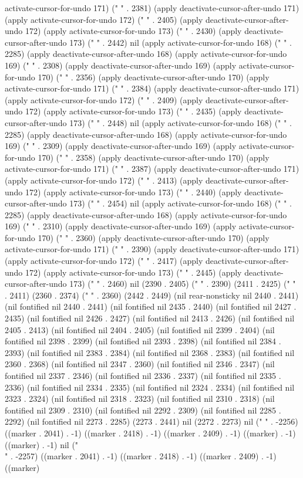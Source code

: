 activate-cursor-for-undo 171) (" " . 2381) (apply deactivate-cursor-after-undo 171) (apply activate-cursor-for-undo 172) (" " . 2405) (apply deactivate-cursor-after-undo 172) (apply activate-cursor-for-undo 173) (" " . 2430) (apply deactivate-cursor-after-undo 173) (" " . 2442) nil (apply activate-cursor-for-undo 168) (" " . 2285) (apply deactivate-cursor-after-undo 168) (apply activate-cursor-for-undo 169) (" " . 2308) (apply deactivate-cursor-after-undo 169) (apply activate-cursor-for-undo 170) (" " . 2356) (apply deactivate-cursor-after-undo 170) (apply activate-cursor-for-undo 171) (" " . 2384) (apply deactivate-cursor-after-undo 171) (apply activate-cursor-for-undo 172) (" " . 2409) (apply deactivate-cursor-after-undo 172) (apply activate-cursor-for-undo 173) (" " . 2435) (apply deactivate-cursor-after-undo 173) (" " . 2448) nil (apply activate-cursor-for-undo 168) (" " . 2285) (apply deactivate-cursor-after-undo 168) (apply activate-cursor-for-undo 169) (" " . 2309) (apply deactivate-cursor-after-undo 169) (apply activate-cursor-for-undo 170) (" " . 2358) (apply deactivate-cursor-after-undo 170) (apply activate-cursor-for-undo 171) (" " . 2387) (apply deactivate-cursor-after-undo 171) (apply activate-cursor-for-undo 172) (" " . 2413) (apply deactivate-cursor-after-undo 172) (apply activate-cursor-for-undo 173) (" " . 2440) (apply deactivate-cursor-after-undo 173) (" " . 2454) nil (apply activate-cursor-for-undo 168) (" " . 2285) (apply deactivate-cursor-after-undo 168) (apply activate-cursor-for-undo 169) (" " . 2310) (apply deactivate-cursor-after-undo 169) (apply activate-cursor-for-undo 170) (" " . 2360) (apply deactivate-cursor-after-undo 170) (apply activate-cursor-for-undo 171) (" " . 2390) (apply deactivate-cursor-after-undo 171) (apply activate-cursor-for-undo 172) (" " . 2417) (apply deactivate-cursor-after-undo 172) (apply activate-cursor-for-undo 173) (" " . 2445) (apply deactivate-cursor-after-undo 173) (" " . 2460) nil (2390 . 2405) ("         " . 2390) (2411 . 2425) ("        " . 2411) (2360 . 2374) ("        " . 2360) (2442 . 2449) (nil rear-nonsticky nil 2440 . 2441) (nil fontified nil 2440 . 2441) (nil fontified nil 2435 . 2440) (nil fontified nil 2427 . 2435) (nil fontified nil 2426 . 2427) (nil fontified nil 2413 . 2426) (nil fontified nil 2405 . 2413) (nil fontified nil 2404 . 2405) (nil fontified nil 2399 . 2404) (nil fontified nil 2398 . 2399) (nil fontified nil 2393 . 2398) (nil fontified nil 2384 . 2393) (nil fontified nil 2383 . 2384) (nil fontified nil 2368 . 2383) (nil fontified nil 2360 . 2368) (nil fontified nil 2347 . 2360) (nil fontified nil 2346 . 2347) (nil fontified nil 2337 . 2346) (nil fontified nil 2336 . 2337) (nil fontified nil 2335 . 2336) (nil fontified nil 2334 . 2335) (nil fontified nil 2324 . 2334) (nil fontified nil 2323 . 2324) (nil fontified nil 2318 . 2323) (nil fontified nil 2310 . 2318) (nil fontified nil 2309 . 2310) (nil fontified nil 2292 . 2309) (nil fontified nil 2285 . 2292) (nil fontified nil 2273 . 2285) (2273 . 2441) nil (2272 . 2273) nil (" " . -2256) ((marker . 2041) . -1) ((marker . 2418) . -1) ((marker . 2409) . -1) ((marker) . -1) ((marker) . -1) nil ("\\" . -2257) ((marker . 2041) . -1) ((marker . 2418) . -1) ((marker . 2409) . -1) ((marker) 